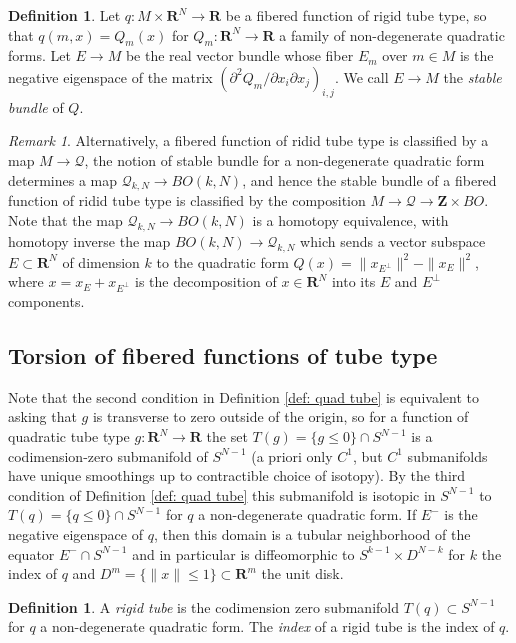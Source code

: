 \documentclass{amsart}
\newcommand\cQ{\mathcal{Q}}
\def\bR{\mathbf{R}}
\def\bZ{\mathbf{Z}}
\theoremstyle{definition}
\newtheorem{definition}[theorem]{Definition}
\theoremstyle{remark}
\newtheorem{inductive lemma}[theorem]{Inductive Lemma}
\newtheorem{remark}[theorem]{Remark}
\begin{document}
\begin{definition}
Let $q:M \times \bR^N \to \bR$ be a fibered function of rigid tube type, so that $q(m,x)=Q_m(x)$ for $Q_m:\bR^N \to \bR$ a family of non-degenerate quadratic forms. Let $E \to M$ be the real vector bundle whose fiber $E_m$ over $m \in M$ is the negative eigenspace of the matrix $(\partial^2 Q_m/\partial x_i\partial  x_j)_{i,j}$. We call $E \to M$ the {\em stable bundle} of $Q$.
\end{definition}

\begin{remark}
Alternatively, a fibered function of ridid tube type is classified by a map $M \to \cQ$, the notion of stable bundle for a non-degenerate quadratic form determines a map $\cQ_{k,N} \to BO(k,N)$, and hence the stable bundle of a fibered function of ridid tube type is classified by the composition $M \to \cQ \to \bZ \times BO$. Note that the map $\cQ_{k,N} \to BO(k,N)$ is a homotopy equivalence, with homotopy inverse the map $BO(k,N) \to \cQ_{k,N}$ which sends a vector subspace $E \subset \bR^N$ of dimension $k$ to the quadratic form $Q(x)=\|x_{E^\perp} \|^2-\|x_E \|^2$, where $x=x_E+x_{E^\perp}$ is the decomposition of $x \in \bR^N$ into its $E$ and $E^{\perp}$ components.
\end{remark}


\subsection{Torsion of fibered functions of tube type}


Note that the second condition in Definition \ref{def: quad tube} is equivalent to asking that $g$ is transverse to zero outside of the origin, so for a function of quadratic tube type $g:\bR^N \to \bR$ the set $T(g)=\{g \leq 0 \} \cap S^{N-1}$ is a codimension-zero submanifold of $S^{N-1}$ (a priori only $C^1$, but $C^1$ submanifolds have unique smoothings up to contractible choice of isotopy). By the third condition of Definition \ref{def: quad tube} this submanifold is isotopic in $S^{N-1}$ to $T(q)=\{ q \leq 0 \} \cap S^{N-1}$ for $q$ a non-degenerate quadratic form. If $E^-$ is the negative eigenspace of $q$, then this domain is a tubular neighborhood of the equator $E^- \cap S^{N-1}$ and in particular is diffeomorphic to $S^{k-1} \times D^{N-k}$ for $k$ the index of $q$ and $D^m=\{ \|x\| \leq 1\} \subset \bR^m$ the unit disk. 

\begin{definition}
A {\em{rigid tube}} is the codimension zero submanifold $T(q) \subset S^{N-1}$ for $q$ a non-degenerate quadratic form. The {\em index} of a rigid tube is the index of $q$.
\end{definition}
\end{document}
